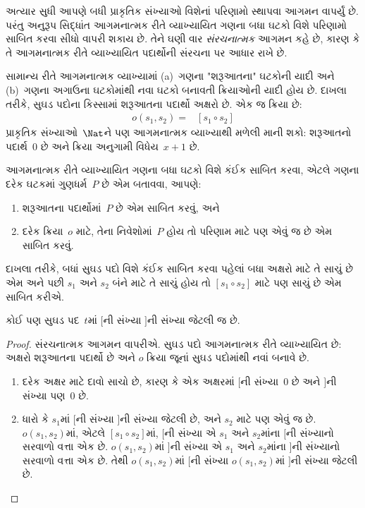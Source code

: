 \begingroup
\makeatletter{}\makeatother


\label{guunit:OLP-0618}


અત્યાર સુધી આપણે બધી પ્રાકૃતિક સંખ્યાઓ વિશેનાં
પરિણામો સ્થાપવા આગમન વાપર્યું છે. પરંતુ અનુરૂપ
સિદ્ધાંત આગમનાત્મક રીતે વ્યાખ્યાયિત ગણના બધા
ઘટકો વિશે પરિણામો સાબિત કરવા સીધો વાપરી
શકાય છે. તેને ઘણી વાર \emph{સંરચનાત્મક} આગમન
કહે છે, કારણ કે તે આગમનાત્મક રીતે વ્યાખ્યાયિત
પદાર્થોની સંરચના પર આધાર રાખે છે.

સામાન્ય રીતે આગમનાત્મક વ્યાખ્યામાં (a)~ગણના
"શરૂઆતના" ઘટકોની યાદી અને (b)~ગણના
અગાઉના ઘટકોમાંથી નવા ઘટકો
બનાવતી ક્રિયાઓની યાદી હોય છે. દાખલા તરીકે,
સુઘડ પદોના કિસ્સામાં શરૂઆતના પદાર્થો અક્ષરો છે.
એક જ ક્રિયા છે:
\begin{align*}
  o(s_1, s_2) = & [s_1 \circ s_2]
\end{align*}
પ્રાકૃતિક સંખ્યાઓ~$\Nat$ને પણ આગમનાત્મક
વ્યાખ્યાથી મળેલી માની શકો: શરૂઆતનો પદાર્થ~$0$
છે અને ક્રિયા અનુગામી વિધેય~$x + 1$ છે.

આગમનાત્મક રીતે વ્યાખ્યાયિત ગણના બધા ઘટકો
વિશે કંઈક સાબિત કરવા, એટલે ગણના દરેક
ઘટકમાં ગુણધર્મ~$P$ છે એમ બતાવવા,
આપણે:
\begin{enumerate}
\item શરૂઆતના પદાર્થોમાં~$P$ છે એમ સાબિત કરવું, અને
\item દરેક ક્રિયા~$o$ માટે, તેના નિવેશોમાં~$P$
  હોય તો પરિણામ માટે પણ એવું જ છે એમ સાબિત કરવું.
\end{enumerate}
દાખલા તરીકે, બધાં સુઘડ પદો વિશે કંઈક સાબિત
કરવા પહેલાં બધા અક્ષરો માટે તે સાચું છે એમ
અને પછી $s_1$ અને $s_2$ બંને માટે તે સાચું
હોય તો $[s_1 \circ s_2]$ માટે પણ સાચું છે
એમ સાબિત કરીએ.

\begin{prop}
  કોઈ પણ સુઘડ પદ~$t$માં $[$ની સંખ્યા $]$ની
  સંખ્યા જેટલી જ છે.
\end{prop}

\begin{proof}
સંરચનાત્મક આગમન વાપરીએ. સુઘડ પદો આગમનાત્મક
રીતે વ્યાખ્યાયિત છે: અક્ષરો શરૂઆતના પદાર્થો છે
અને $o$ ક્રિયા જૂનાં સુઘડ પદોમાંથી નવાં બનાવે છે.
\begin{enumerate}
\item દરેક અક્ષર માટે દાવો સાચો છે, કારણ કે એક
  અક્ષરમાં $[$ની સંખ્યા~$0$ છે અને $]$ની
  સંખ્યા પણ~$0$ છે.
\item ધારો કે $s_1$માં $[$ની સંખ્યા $]$ની
  સંખ્યા જેટલી છે, અને $s_2$ માટે પણ એવું
  જ છે. $o(s_1, s_2)$માં, એટલે
  $[s_1 \circ s_2]$માં, $[$ની સંખ્યા એ
  $s_1$ અને $s_2$માંના $[$ની સંખ્યાનો
  સરવાળો વત્તા એક છે. $o(s_1, s_2)$માં
  $]$ની સંખ્યા એ $s_1$ અને $s_2$માંના
  $]$ની સંખ્યાનો સરવાળો વત્તા એક છે.
  તેથી $o(s_1, s_2)$માં $[$ની સંખ્યા
  $o(s_1,s_2)$માં $]$ની સંખ્યા જેટલી છે.
\end{enumerate}
\end{proof}

